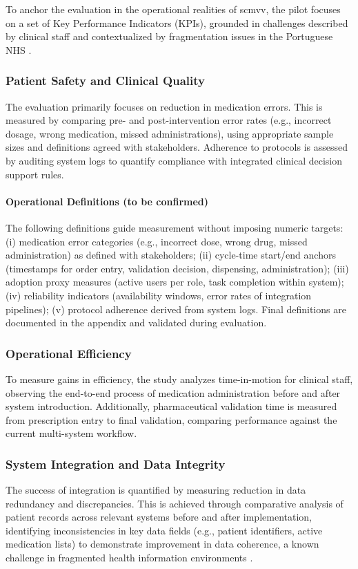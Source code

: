 To anchor the evaluation in the operational realities of \gls{scmvv}, the pilot focuses on a set of Key Performance Indicators (KPIs), grounded in challenges described by clinical staff and contextualized by fragmentation issues in the Portuguese NHS \cite{goiana2024portuguese, nunes2021articulacao}.

\subsubsection{Patient Safety and Clinical Quality}
The evaluation primarily focuses on reduction in medication errors. This is measured by comparing pre- and post-intervention error rates (e.g., incorrect dosage, wrong medication, missed administrations), using appropriate sample sizes and definitions agreed with stakeholders. Adherence to protocols is assessed by auditing system logs to quantify compliance with integrated clinical decision support rules.

\paragraph{Operational Definitions (to be confirmed)} The following definitions guide measurement without imposing numeric targets: (i) medication error categories (e.g., incorrect dose, wrong drug, missed administration) as defined with stakeholders; (ii) cycle-time start/end anchors (timestamps for order entry, validation decision, dispensing, administration); (iii) adoption proxy measures (active users per role, task completion within system); (iv) reliability indicators (availability windows, error rates of integration pipelines); (v) protocol adherence derived from system logs. Final definitions are documented in the appendix and validated during evaluation.

\subsubsection{Operational Efficiency}
To measure gains in efficiency, the study analyzes time-in-motion for clinical staff, observing the end-to-end process of medication administration before and after system introduction. Additionally, pharmaceutical validation time is measured from prescription entry to final validation, comparing performance against the current multi-system workflow.

\subsubsection{System Integration and Data Integrity}
The success of integration is quantified by measuring reduction in data redundancy and discrepancies. This is achieved through comparative analysis of patient records across relevant systems before and after implementation, identifying inconsistencies in key data fields (e.g., patient identifiers, active medication lists) to demonstrate improvement in data coherence, a known challenge in fragmented health information environments \cite{pinto2016identification}. 